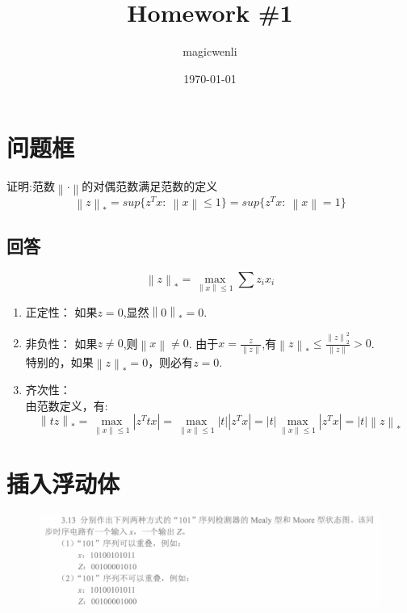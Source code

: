 \documentclass[
	12pt, %
	cn, %
]{mwhw}
\title{Homework \#1} %
\author{magicwenli} %
\date{\today} %
\institute{Xi'an Jiao Tong University \\ Computer Science and Technology} %
\newcommand{\norm}[1]{\left\lVert#1\right\rVert}
\begin{document}
\maketitle %


\section*{问题框}

\begin{problem}
	证明:范数$\norm{\cdot}$的对偶范数满足范数的定义
	\begin{equation*}
	    \norm{z}_*=sup\{z^Tx:\ \norm{x}\leq1\}=sup\{z^Tx:\ \norm{x}=1\}
	\end{equation*}
\end{problem}



\subsection*{回答}
    \begin{equation*}
        \norm{z}_*=\max_{\norm{x}\leq 1}\sum{z_ix_i}
    \end{equation*}
    \begin{enumerate}
    \item 正定性：
    如果$z=0$,显然$\norm{0}_*=0$.
    \item 非负性：
    如果$z\neq 0$,则$\norm{x}\neq 0$. 由于$x=\frac{z}{\norm{z}}$,有$\norm{z}_*\leq \frac{\norm{z}^2_2}{\norm{z}}>0$.\\
    特别的，如果$\norm{z}_*=0$，则必有$z=0$.
    \item 齐次性：\\
    由范数定义，有:
    \begin{equation*}
        \norm{tz}_*=\max_{\norm{x}\leq 1} | z^Ttx|=\max_{\norm{x}\leq 1}|t||z^Tx |=|t| \max_{\norm{x}\leq 1} | z^Tx |=|t|\norm{z}_*
    \end{equation*}
\end{enumerate}

\section*{插入浮动体}
\begin{figure}[htb]
	\centering
	\includegraphics[width=16cm]{src/shuDian-313}
\end{figure}
\end{document}
